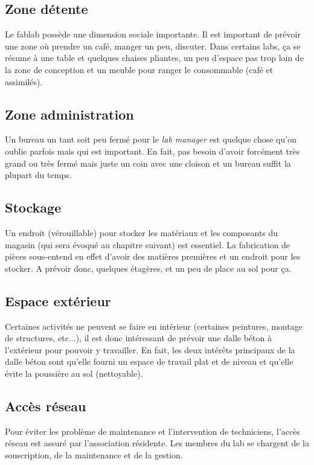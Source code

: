 \subsection{Zone détente}

Le fablab possède une dimension sociale importante. Il est important de prévoir une zone où prendre un café, manger un
peu, discuter. Dans certains labs, ça se résume à une table et quelques chaises pliantes, un peu d'espace pas trop loin
de la zone de conception et un meuble pour ranger le consommable (café et assimilés).

\subsection{Zone administration}

Un bureau un tant soit peu fermé pour le \textit{lab manager} est quelque chose qu'on oublie parfois mais qui est important. En
fait, pas besoin d'avoir forcément très grand ou très fermé mais juste un coin avec une cloison et un bureau suffit la
plupart du temps.

\subsection{Stockage}

Un endroit (vérouillable) pour stocker les matériaux et les composants du magasin (qui sera évoqué au chapitre suivant)
est essentiel. La fabrication de pièces sous-entend en effet d'avoir des matières premières et un endroit pour les
stocker. A prévoir donc, quelques étagères, et un peu de place au sol pour ça.

\subsection{Espace extérieur}

Certaines activités ne peuvent se faire en intérieur (certaines peintures, montage de structures, etc...), il est donc
intéressant de prévoir une dalle béton à l'extérieur pour pouvoir y travailler. En fait, les deux intérêts principaux de
la dalle béton sont qu'elle fourni un espace de travail plat et de niveau et qu'elle évite la poussière au sol
(nettoyable).

\subsection{Accès réseau}

Pour éviter les problème de maintenance et l'intervention de techniciens, l'accès réseau est assuré par l'association
résidente. Les membres du lab se chargent de la souscription, de la maintenance et de la gestion.

